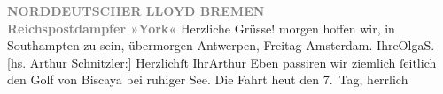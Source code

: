 \begin{ledgroupsized}[t]{13cm}
           \noindent{}\centering{}{\pb}\textcolor{gray}{\textbf{NORDDEUTSCHER LLOYD BREMEN}}{\\}\textcolor{gray}{\textbf{Reichspostdampfer »York«}}\pend
           \pstart
           \noindent{}{\pb}Herzliche Grüsse!\pend
           \pstart
           morgen hoffen wir, in Southampten zu sein,
               übermorgen Antwerpen, Freitag{ }Amsterdam.\pend
           \pstart Ihre\spacefill\mbox{OlgaS.}\pend{}\pstart
           {\pb}{[}hs. Arthur Schnitzler:{]} Herzlichſt Ihr\spacefill\mbox{Arthur}\pend
           \pstart
           Eben passiren wir ziemlich ſeitlich den Golf von
                  Biscaya bei ruhiger See.\pend
           \pstart
           Die Fahrt heut den 7. Tag, herrlich\pend
           
         
         \endnumbering{}\end{ledgroupsized}  \newcommand{\dateiname}{L02562}\newcommand{\titel}{Olga und Arthur Schnitzler an Richard und Paula Beer-Hofmann, [19. 5. 1914]}\newcommand{\editorInnen}{Martin Anton Müller und Gerd-Hermann Susen}
      